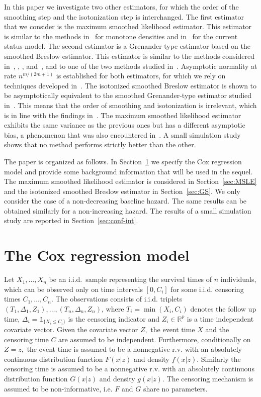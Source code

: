 \documentclass[11pt,reqno]{amsart}
\theoremstyle{definition}
\theoremstyle{plain}
\theoremstyle{remark}
\begin{document}
In this paper we investigate two other estimators,
for which the order of the smoothing step and the isotonization step is interchanged.
The first estimator that we consider is the maximum smoothed likelihood estimator.
This estimator is similar to the methods in~\cite{eggermont-lariccia2000} for monotone densities and in~\cite{GJW10} for the current status model.
The second estimator is a Grenander-type estimator based on the smoothed Breslow estimator.
This estimator is similar to the methods considered in~\cite{chenglin1981}, \cite{wright1982}, \cite{friedmantibshirani1984}, and~\cite{vdvaart-vdlaan2003},
and to one of the two methods studied in~\cite{mammen1991}.
Asymptotic normality at rate $n^{m/(2m+1)}$ is established for both estimators, for which we rely on techniques developed in~\cite{GJW10}.
The isotonized smoothed Breslow estimator is shown to be asymptotically equivalent to the smoothed Grenander-type estimator studied in~\cite{LopuhaaMustaSI2016}.
This means that the order of smoothing and isotonization is irrelevant, which is in line with the findings in~\cite{mammen1991}.
The maximum smoothed likelihood estimator exhibits the same variance as the previous ones but has a different asymptotic bias,
a phenomenon that was also encountered in~\cite{GJW10}.
A small simulation study shows that no method performs strictly better than the other.

The paper is organized as follows.
In Section~\ref{sec:model} we specify the Cox regression model and provide some background information that will be used  in the sequel.
The maximum smoothed likelihood estimator is considered in Section~\ref{sec:MSLE}
and the isotonized smoothed Breslow estimator in Section~\ref{sec:GS}.
We only consider the case of a non-decreasing baseline hazard.
The same results can be obtained similarly for a non-increasing hazard.
The results of a small simulation study are reported in Section~\ref{sec:conf-int}.

\section{The Cox regression model}\label{sec:model}
Let $X_1,\dots,X_n$ be an i.i.d.~sample representing the survival times of $n$ individuals, which can be observed only on time intervals $[0,C_i]$ for some i.i.d. censoring times $C_1,\dots,C_n$. The observations consists of  i.i.d. triplets $(T_1,\Delta_1,Z_1),\dots,(T_n,\Delta_n,Z_n)$, where $T_i=\min(X_i,C_i)$ denotes the follow up time,  $\Delta_i={\mathds{1}}_{\{X_i\leq C_i\}}$ is the censoring indicator and $Z_i\in{\mathbb{R}}^p$ is a time independent covariate vector. Given the covariate vector $Z,$ the event time $X$ and the censoring time $C$ are assumed to be independent. Furthermore, conditionally on $Z=z,$ the event time is assumed to be a nonnegative r.v. with an absolutely continuous distribution function $F(x|z)$ and density $f(x|z).$ Similarly the censoring time is assumed to be a nonnegative r.v. with an absolutely continuous distribution function $G(x|z)$ and density $g(x|z).$ The censoring mechanism is assumed to be non-informative, i.e. $F$ and $G$ share no parameters.
\end{document}
